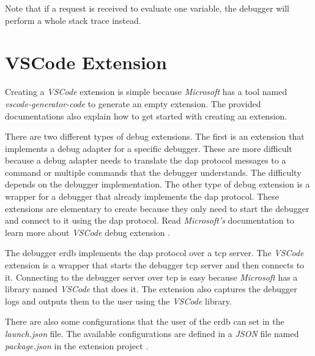 Note that if a request is received to evaluate one variable, the debugger will perform a whole stack trace instead.



\section{VSCode Extension}
Creating a \emph{VSCode} extension is simple because \emph{Microsoft} has a tool named \emph{vscode-generator-code} \cite{vscode-generator-code} to generate an empty extension.
The provided documentations also explain how to get started with creating an extension.


There are two different types of debug extensions.
The first is an extension that implements a debug adapter for a specific debugger.
These are more difficult because a debug adapter needs to translate the \gls{dap} protocol messages to a command or multiple commands that the debugger understands.
The difficulty depends on the debugger implementation.
The other type of debug extension is a wrapper for a debugger that already implements the \gls{dap} protocol.
These extensions are elementary to create because they only need to start the debugger and connect to it using the \gls{dap} protocol.
Read \emph{Microsoft's} documentation to learn more about \emph{VSCode} debug extension \cite{vscode-debugger-extension-doc}.


The debugger \acrlong{erdb} implements the \gls{dap} protocol over a \gls{tcp} server.
The \emph{VSCode} extension is a wrapper that starts the debugger \gls{tcp} server and then connects to it.
Connecting to the debugger server over \gls{tcp} is easy because \emph{Microsoft} has a library named \emph{VSCode} that does it.
The extension also captures the debugger logs and outputs them to the user using the \emph{VSCode} library.


There are also some configurations that the user of the \gls{erdb} can set in the \emph{launch.json} file.
The available configurations are defined in a \emph{JSON} file named \emph{package.json} in the extension project \cite{erdb-vscode}.
